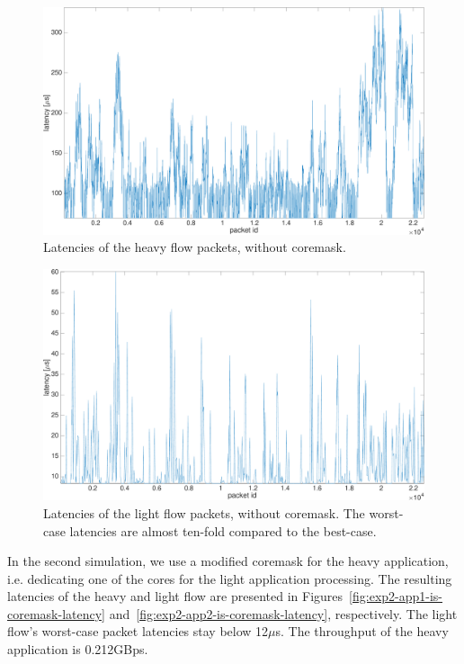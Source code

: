 \begin{figure}[]
  \begin{center}
    \includegraphics[width=\textwidth]{images/experiment/exp2-app1-no-coremask-latency.pdf}
    \caption{Latencies of the heavy flow packets, without coremask.}
    \label{fig:exp2-app1-no-coremask-latency}
  \end{center}
\end{figure}

\begin{figure}[]
  \begin{center}
    \includegraphics[width=\textwidth]{images/experiment/exp2-app2-no-coremask-latency.pdf}
    \caption{Latencies of the light flow packets, without coremask. The worst-case latencies are almost ten-fold compared to the best-case.}
    \label{fig:exp2-app2-no-coremask-latency}
  \end{center}
\end{figure}

In the second simulation, we use a modified coremask for the heavy application, i.e. dedicating one of the cores for the light application processing. The resulting latencies of the heavy and light flow are presented in Figures~\ref{fig:exp2-app1-is-coremask-latency} and~\ref{fig:exp2-app2-is-coremask-latency}, respectively. The light flow's worst-case packet latencies stay below 12$\mu$s. The throughput of the heavy application is 0.212GBps.


